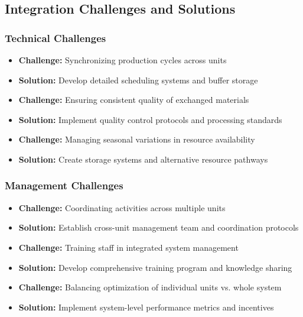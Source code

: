 \subsection{Integration Challenges and Solutions}

\subsubsection{Technical Challenges}
\begin{itemize}
    \item \textbf{Challenge:} Synchronizing production cycles across units
    \item \textbf{Solution:} Develop detailed scheduling systems and buffer storage
    
    \item \textbf{Challenge:} Ensuring consistent quality of exchanged materials
    \item \textbf{Solution:} Implement quality control protocols and processing standards
    
    \item \textbf{Challenge:} Managing seasonal variations in resource availability
    \item \textbf{Solution:} Create storage systems and alternative resource pathways
\end{itemize}

\subsubsection{Management Challenges}
\begin{itemize}
    \item \textbf{Challenge:} Coordinating activities across multiple units
    \item \textbf{Solution:} Establish cross-unit management team and coordination protocols
    
    \item \textbf{Challenge:} Training staff in integrated system management
    \item \textbf{Solution:} Develop comprehensive training program and knowledge sharing
    
    \item \textbf{Challenge:} Balancing optimization of individual units vs. whole system
    \item \textbf{Solution:} Implement system-level performance metrics and incentives
\end{itemize}

